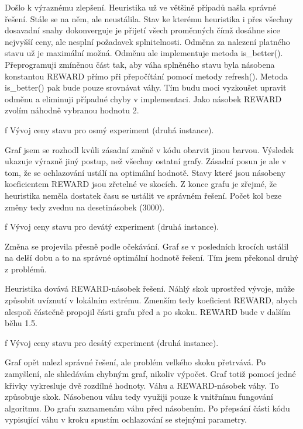 Došlo k výraznému zlepšení. Heuristika už ve většině případů našla správné řešení. Stále se na něm, ale neustálila. Stav ke kterému heuristika i přes všechny dosavadní snahy dokonverguje je přijetí všech proměnných čímž dosáhne sice nejvyšší ceny, ale nesplní požadavek splnitelnosti. Odměna za nalezení platného stavu už je maximální možná. Odměnu ale implementuje metoda is\_better(). Přeprogramuji zmíněnou část tak, aby váha splněného stavu byla násobena konstantou REWARD přímo při přepočítání pomocí metody refresh(). Metoda is\_better() pak bude pouze srovnávat váhy. Tím budu moci vyzkoušet upravit odměnu a eliminuji případné chyby v implementaci. Jako násobek REWARD zvolím náhodně vybranou hodnotu 2.

\vfill\break
\centerline{ \picwidth=14cm  }
\caption/f Vývoj ceny stavu pro osmý experiment (druhá instance).
\bigskip

Graf jsem se rozhodl kvůli zásadní změně v kódu obarvit jinou barvou. Výsledek ukazuje výrazně jiný postup, než všechny ostatní grafy. Zásadní posun je ale v tom, že se ochlazování ustálí na optimální hodnotě. Stavy které jsou násobeny koeficientem REWARD jsou zřetelné ve skocích. Z konce grafu je zřejmé, že heuristika neměla dostatek času se ustálit ve správném řešení. Počet kol beze změny tedy zvednu na desetinásobek (3000).

\centerline{ \picwidth=14cm  }
\caption/f Vývoj ceny stavu pro devátý experiment (druhá instance).
\bigskip

Změna se projevila přesně podle očekávání. Graf se v posledních krocích ustálil na delší dobu a to na správné optimální hodnotě řešení. Tím jsem překonal druhý z problémů.

Heuristika dovává REWARD-násobek řešení. Náhlý skok uprostřed vývoje, může způsobit uvíznutí v lokálním extrému. Zmenším tedy koeficient REWARD, abych alespoň částečně propojil části grafu před a po skoku. REWARD bude v dalším běhu 1.5.

\centerline{ \picwidth=14cm  }
\caption/f Vývoj ceny stavu pro desátý experiment (druhá instance).
\bigskip

Graf opět nalezl správné řešení, ale problém velkého skoku přetrvává. Po zamyšlení, ale shledávám chybným graf, nikoliv výpočet. Graf totiž pomocí jedné křivky vykresluje dvě rozdílné hodnoty. Váhu a REWARD-násobek váhy. To způsobuje skok. Násobenou váhu tedy využiji pouze k vnitřnímu fungování algoritmu. Do grafu zaznamenám váhu před násobením. Po přepsání části kódu vypisující váhu v kroku spustím ochlazování se stejnými parametry.

